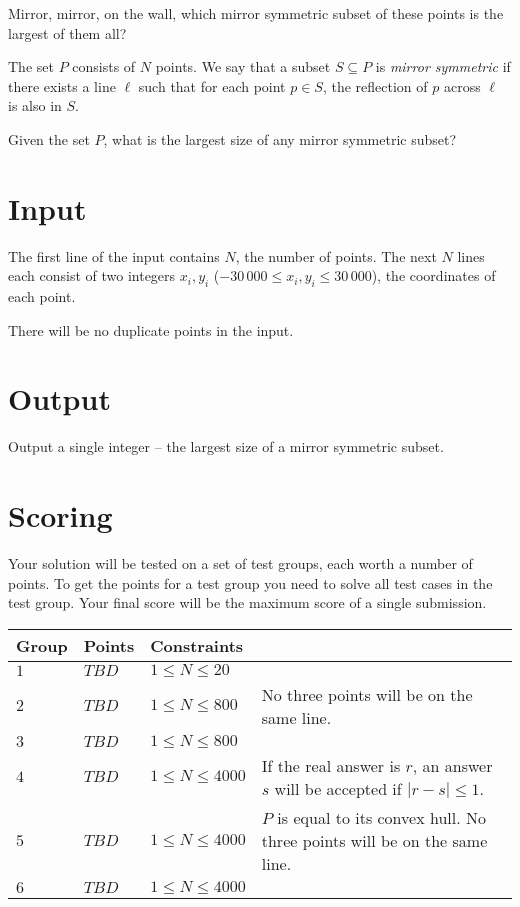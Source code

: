 
Mirror, mirror, on the wall, which mirror symmetric subset of these points is the largest of them all?

The set $P$ consists of $N$ points. We say that a subset $S \subseteq P$ is
\emph{mirror symmetric} if there exists a line $\ell$ such that for each point
$p \in S$, the reflection of $p$ across $\ell$ is also in $S$.

Given the set $P$, what is the largest size of any mirror symmetric subset?

\section*{Input}
The first line of the input contains $N$, the number of points.
The next $N$ lines each consist of two integers $x_i, y_i$ ($-30\,000 \le x_i, y_i \le 30\,000$), the coordinates of each point.

There will be no duplicate points in the input.

\section*{Output}
Output a single integer -- the largest size of a mirror symmetric subset.

\section*{Scoring}
Your solution will be tested on a set of test groups, each worth a number of points.
To get the points for a test group you need to solve all test cases in the test group.
Your final score will be the maximum score of a single submission.

\noindent
\begin{tabular}{| l | l | l | l |}
\hline
Group & Points & Constraints \\ \hline
$1$    & $TBD$         & $1 \leq N \leq 20$ & \\ \hline
$2$    & $TBD$         & $1 \leq N \leq 800$ & No three points will be on the same line.\\ \hline
$3$    & $TBD$         & $1 \leq N \leq 800$ & \\ \hline
$4$    & $TBD$         & $1 \leq N \leq 4000$ & If the real answer is $r$, an answer $s$ will be accepted if $|r-s| \leq 1$.\\ \hline
$5$    & $TBD$         & $1 \leq N \leq 4000$ & $P$ is equal to its convex hull. No three points will be on the same line.\\ \hline
$6$    & $TBD$         & $1 \leq N \leq 4000$ & \\ \hline
\end{tabular}
